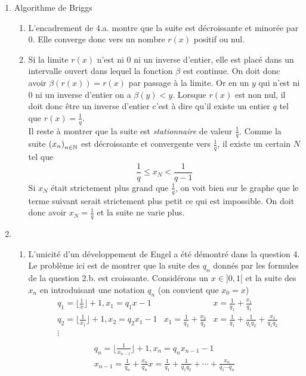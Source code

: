 \begin{enumerate}
\item Algorithme de Briggs
\begin{enumerate}
 \item L'encadrement de 4.a. montre que la suite est décroissante et minorée par $0$. Elle converge donc vers un nombre $r(x)$ positif ou nul.
\item Si la limite $r(x)$ n'est ni $0$ ni un inverse d'entier, elle est placé dans un intervalle ouvert dans lequel la fonction $\beta$ est continue. On doit donc avoir $\beta(r(x))=r(x)$ par passage à la limite. Or en un $y$ qui n'est ni $0$ ni un inverse d'entier on a $\beta(y)<y$. Lorsque $r(x)$ est non nul, il doit donc être un inverse d'entier c'est à dire qu'il existe un entier $q$ tel que $r(x)=\frac{1}{q}$.\\
Il reste à montrer que la suite est \emph{stationnaire} de valeur $\frac{1}{q}$. Comme la suite $\left( x_n\right) _{n\in \mathbb{N}}$ est décroissante et convergente vers $\frac{1}{q}$, il existe un certain $N$ tel que 
\begin{displaymath}
 \frac{1}{q}\leq x_N <\frac{1}{q-1} 
\end{displaymath}
Si $x_N$ était strictement plus grand que $\frac{1}{q}$, on voit bien sur le graphe que le terme suivant serait strictement plus petit ce qui est impossible. On doit donc avoir $x_N=\frac{1}{q}$ et la suite ne varie plus.
\end{enumerate}

\item \begin{enumerate}
 \item L'unicité d'un développement de Engel a été démontré dans la question 4. Le problème ici est de montrer que la suite des $q_n$ donnés par les formules de la question 2.b. est croissante. Considérons un $x\in ]0,1[$ et la suite des $x_n$ en introduisant une notation $q_n$ (on convient que $x_0=x$)
\begin{align*}
&q_1 = \lfloor \frac{1}{x}\rfloor +1,x_1 = q_1 x - 1     &  &x = \frac{1}{q_1} + \frac{x_1}{q_1} \\
&q_2 = \lfloor \frac{1}{x_1}\rfloor +1,x_2 = q_2 x_1 - 1 &x_1 = \frac{1}{q_2} + \frac{x_2}{q_2}& x = \frac{1}{q_1} + \frac{1}{q_1q_2} + \frac{x_1}{q_1q_2} \\
 &  \vdots &  &\\
\end{align*}
\begin{multline*}
q_n = \lfloor \frac{1}{x_{n-1}}\rfloor +1,x_n = q_n x_{n-1} - 1 \\
x_{n-1}  = \frac{1}{q_n} + \frac{x_n}{q_n} x = \frac{1}{q_1} + \frac{1}{q_1q_2} + \cdots +\frac{x_n}{q_1\cdots q_n}  
\end{multline*}


\end{enumerate}
\end{enumerate}
